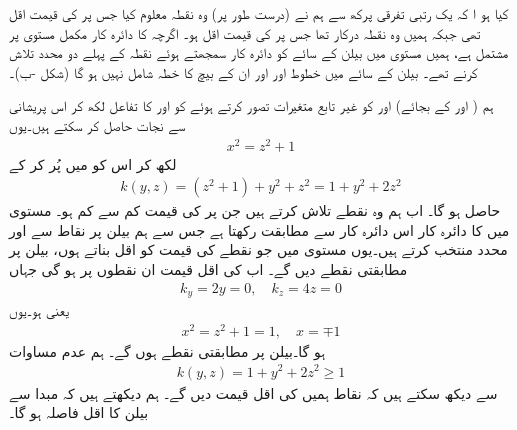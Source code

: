 کیا  ہو ا کہ یک رتبی تفرقی پرکھ  سے ہم نے (درست طور پر)      وہ نقطہ  معلوم کیا  جس پر  کی قیمت اقل  تھی   جبکہ ہمیں   وہ نقطہ درکار  تھا  جس پر  کی قیمت اقل ہو۔ اگرچہ  کا دائرہ کار  مکمل  مستوی  پر مشتمل  ہے، ہمیں مستوی  میں بیلن کے سائے   کو  دائرہ کار  سمجھتے  ہوئے  نقطہ  کے پہلے دو محدد   تلاش کرنے تھے۔  بیلن کے سائے  میں خطوط   اور  اور ان  کے بیچ کا  خطہ شامل نہیں ہو گا (شکل -ب)۔

ہم ( اور  کے بجائے)     اور  کو غیر تابع متغیرات تصور کرتے ہوئے   کو  اور  کا تفاعل لکھ کر اس  پریشانی سے نجات حاصل کر سکتے ہیں۔یوں
\begin{align*}
x^2=z^2+1
\end{align*}
لکھ کر اس کو    میں پُر کر کے  
\begin{align*}
k(y,z)=(z^2+1)+y^2+z^2=1+y^2+2z^2
\end{align*}
حاصل  ہو گا۔ اب  ہم وہ نقطے تلاش کرتے ہیں جن پر  کی قیمت کم سے کم ہو۔ مستوی    میں  کا دائرہ کار اس دائرہ کار سے مطابقت رکھتا ہے جس سے ہم بیلن پر نقاط   سے  اور  محدد منتخب کرتے ہیں۔یوں مستوی   میں  جو نقطے   کی قیمت کو اقل بناتے ہوں، بیلن پر مطابقتی نقطے دیں گے۔ اب  کی اقل قیمت ان نقطوں پر ہو گی جہاں
\begin{align*}
k_y=2y=0,\quad k_z=4z=0
\end{align*}
یعنی  ہو۔یوں
\begin{align*}
x^2=z^2+1=1,\quad x=\mp 1
\end{align*}
ہو گا۔بیلن پر مطابقتی نقطے   ہوں گے۔ ہم عدم مساوات
\begin{align*}
k(y,z)=1+y^2+2z^2\ge 1
\end{align*}
سے دیکھ سکتے ہیں کہ نقاط  ہمیں  کی اقل قیمت دیں گے۔ ہم  دیکھتے  ہیں کہ مبدا سے بیلن کا اقل فاصلہ  ہو گا۔

